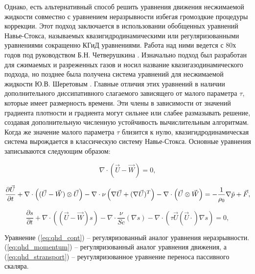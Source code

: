 Однако, есть альтернативный способ решить уравнения движения несжимаемой жидкости совместно с уравнением неразрывности избегая громоздкие процедуры коррекции. Этот подход заключается в использовании обобщенных уравнений Навье-Стокса, называемых квазигидродинамическими или регуляризованными уравнениями сокращенно КГиД уравнениями. Работа над ними ведется с 80х годов под руководством Б.Н. Четверушкина \cite{SherBook,ElSh2001}. Изначально подход был разработан для сжимаемых и разреженных газов и носил название квазигазодинамического подхода, но позднее была получена система уравнений для несжимаемой жидкости Ю.В. Шеретовым \cite{SherBook,ElSh2001}. Главные отличия этих уравнений в наличии дополнительного диссипативного слагаемого зависящего от малого параметра $\tau$, которые имеет размерность времени. Эти члены в зависимости от значений градиента плотности и градиента могут сильнее или слабее размазывать решение, создавая дополнительную численную устойчивость вычислительным алгоритмам. Когда же значение малого параметра $\tau$ близится к нулю, квазигидродинамическая система вырождается в классическую систему Навье-Стокса. Основные уравнения записываются следующим образом:

\begin{equation}\label{eq:qhd_cont}
    \nabla \cdot \left (\vec U - \vec W \right ) = 0,
\end{equation}

\begin{equation}\label{eq:qhd_momentum}
      \frac{\partial \vec U}{\partial t} + \nabla \cdot \left ( (\vec U - \vec W)\otimes \vec U  \right )
      -
      \nabla \cdot \nu \left ( \nabla \vec U + (\nabla \vec U)^T \right ) - \nabla \cdot \left  (   \vec U \otimes \vec W \right )
      = 
      - \frac{1}{\rho_0} \nabla \Tilde{p} + \vec F,
\end{equation}

\begin{equation}\label{eq:qhd_stransport}
      \frac{\partial s }{\partial t} + \nabla \cdot \left ( (\vec U - \vec W) s \right )
       - \nabla \cdot \frac{\nu}{Sc} \left ( \nabla s \right ) - \nabla \cdot \left (\tau \vec{U} (\vec{U} \cdot) \nabla s \right) = 0,
\end{equation}

Уравнение (\ref{eq:qhd_cont}) -- регуляризованный аналог уравнения неразрывности. (\ref{eq:qhd_momentum}) -- регуляризованный аналог уравнения движения, а (\ref{eq:qhd_stransport}) -- реугуляризованное уравнение переноса пассивного скаляра. 

